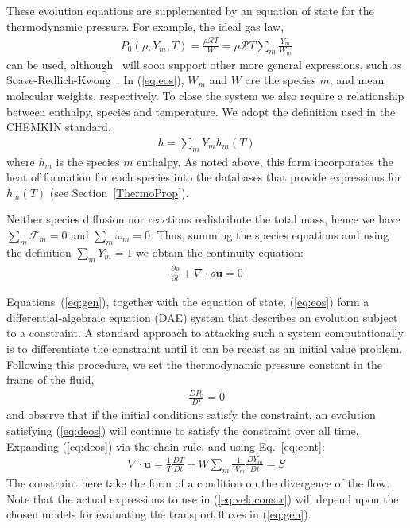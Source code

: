 These evolution equations are supplemented by an equation of state for the thermodynamic pressure.  For example, the ideal gas law,
\begin{eqnarray}
P_0(\rho,Y_m,T)=\frac{\rho \mathcal{R} T}{W}=\rho \mathcal{R} T \sum_m \frac{Y_m}{W_m}
\label{eq:eos}
\end{eqnarray}
can be used, although \pelelm\ will soon support other more general expressions, such as
Soave-Redlich-Kwong~\cite{Soave1972}.  In (\ref{eq:eos}), $W_m$ and $W$ are the species $m$, and mean
molecular weights, respectively.  To close the system
we also require a relationship between enthalpy, species and temperature.  We adopt the definition used in the CHEMKIN standard, 
\begin{eqnarray}
h=\sum_m Y_m h_m(T)
\end{eqnarray}
where $h_m$ is the species $m$ enthalpy.  As noted above, this form incorporates the heat of formation for each species into the databases that provide expressions for $h_m(T)$ (see Section~\ref{ThermoProp}).

Neither species diffusion nor reactions redistribute the total mass, hence we have $\sum_m \boldsymbol{\mathcal{F}}_m = 0$ and $\sum_m \dot{\omega}_m = 0$. Thus, summing the species equations and using the definition $\sum_m Y_m = 1$ we obtain the continuity equation:
\begin{eqnarray}
\frac{\partial \rho}{\partial t} + \nabla \cdot \rho \boldsymbol{u} = 0
\label{eq:cont}
\end{eqnarray}

Equations~(\ref{eq:gen}), together with the equation of state, (\ref{eq:eos}) form a differential-algebraic equation (DAE) system that describes an evolution subject to a constraint.  A standard approach to attacking such a system computationally is to differentiate the constraint until it can be recast as an initial value problem.  Following this procedure, we set the thermodynamic pressure constant in the frame of the fluid,
\begin{eqnarray}
\frac{DP_0}{Dt} = 0
\label{eq:deos}
\end{eqnarray}
and observe that if the initial conditions satisfy the constraint, an evolution satisfying (\ref{eq:deos}) 
will continue to satisfy the constraint over all time.  Expanding (\ref{eq:deos}) via the chain rule, and using
Eq.~\ref{eq:cont}:
\begin{eqnarray}
\nabla \cdot \boldsymbol{u} = \frac{1}{T}\frac{DT}{Dt} + W \sum_m \frac{1}{W_m} \frac{DY_m}{Dt} = S
\label{eq:veloconstr}
\end{eqnarray}
The constraint here take the form of a condition on the divergence of the flow.  Note that the actual expressions to use in (\ref{eq:veloconstr}) will depend upon the chosen models for evaluating the transport fluxes in (\ref{eq:gen}).



